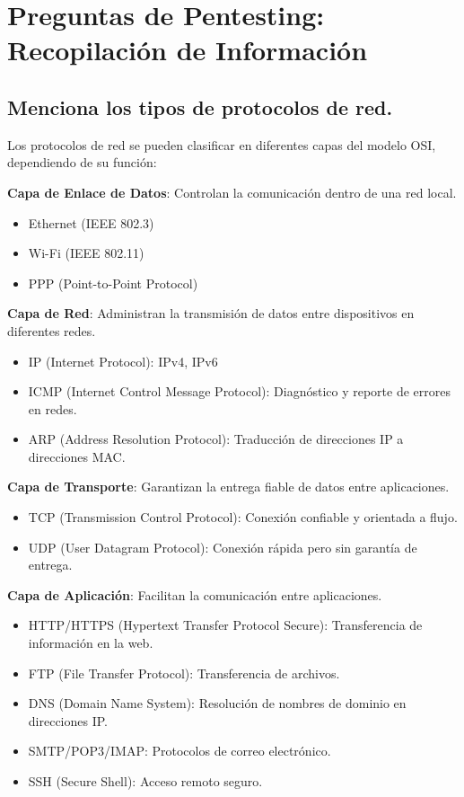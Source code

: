 \section{Preguntas de Pentesting: Recopilación de Información}

\subsection{Menciona los tipos de protocolos de red.}
Los protocolos de red se pueden clasificar en diferentes capas del modelo OSI, dependiendo de su función:

\textbf{Capa de Enlace de Datos}: Controlan la comunicación dentro de una red local.
\begin{itemize}
    \item Ethernet (IEEE 802.3)
    \item Wi-Fi (IEEE 802.11)
    \item PPP (Point-to-Point Protocol)
\end{itemize}

\textbf{Capa de Red}: Administran la transmisión de datos entre dispositivos en diferentes redes.
\begin{itemize}
    \item IP (Internet Protocol): IPv4, IPv6
    \item ICMP (Internet Control Message Protocol): Diagnóstico y reporte de errores en redes.
    \item ARP (Address Resolution Protocol): Traducción de direcciones IP a direcciones MAC.
\end{itemize}

\textbf{Capa de Transporte}: Garantizan la entrega fiable de datos entre aplicaciones.
\begin{itemize}
    \item TCP (Transmission Control Protocol): Conexión confiable y orientada a flujo.
    \item UDP (User Datagram Protocol): Conexión rápida pero sin garantía de entrega.
\end{itemize}

\textbf{Capa de Aplicación}: Facilitan la comunicación entre aplicaciones.
\begin{itemize}
    \item HTTP/HTTPS (Hypertext Transfer Protocol Secure): Transferencia de información en la web.
    \item FTP (File Transfer Protocol): Transferencia de archivos.
    \item DNS (Domain Name System): Resolución de nombres de dominio en direcciones IP.
    \item SMTP/POP3/IMAP: Protocolos de correo electrónico.
    \item SSH (Secure Shell): Acceso remoto seguro.
\end{itemize}

